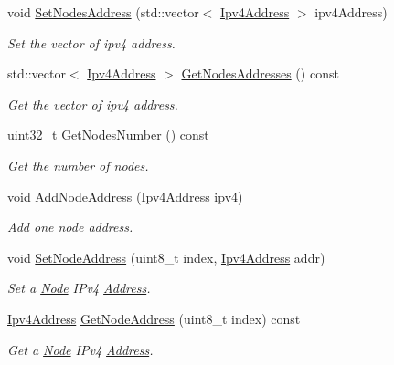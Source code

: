 \begin{DoxyCompactItemize}
void \hyperlink{classns3_1_1dsr_1_1DsrOptionRreqHeader_a0bff4d1e588cb2c91ad8b48cf5e551bb}{Set\+Nodes\+Address} (std\+::vector$<$ \hyperlink{classns3_1_1Ipv4Address}{Ipv4\+Address} $>$ ipv4\+Address)
\begin{DoxyCompactList}\small\item\em Set the vector of ipv4 address. \end{DoxyCompactList}\item 
std\+::vector$<$ \hyperlink{classns3_1_1Ipv4Address}{Ipv4\+Address} $>$ \hyperlink{classns3_1_1dsr_1_1DsrOptionRreqHeader_a5998beb11675cb708d9a943a01487ce6}{Get\+Nodes\+Addresses} () const 
\begin{DoxyCompactList}\small\item\em Get the vector of ipv4 address. \end{DoxyCompactList}\item 
uint32\+\_\+t \hyperlink{classns3_1_1dsr_1_1DsrOptionRreqHeader_aae0419a21f155cd8f28f781abd7c3ad4}{Get\+Nodes\+Number} () const 
\begin{DoxyCompactList}\small\item\em Get the number of nodes. \end{DoxyCompactList}\item 
void \hyperlink{classns3_1_1dsr_1_1DsrOptionRreqHeader_ae129d6d2ffc45297396b07b50fcd36e5}{Add\+Node\+Address} (\hyperlink{classns3_1_1Ipv4Address}{Ipv4\+Address} ipv4)
\begin{DoxyCompactList}\small\item\em Add one node address. \end{DoxyCompactList}\item 
void \hyperlink{classns3_1_1dsr_1_1DsrOptionRreqHeader_a32c1953d0668c8a401835a34f46b2aff}{Set\+Node\+Address} (uint8\+\_\+t index, \hyperlink{classns3_1_1Ipv4Address}{Ipv4\+Address} addr)
\begin{DoxyCompactList}\small\item\em Set a \hyperlink{classns3_1_1Node}{Node} I\+Pv4 \hyperlink{classns3_1_1Address}{Address}. \end{DoxyCompactList}\item 
\hyperlink{classns3_1_1Ipv4Address}{Ipv4\+Address} \hyperlink{classns3_1_1dsr_1_1DsrOptionRreqHeader_a7ec2e031d3996323118702d805aabe9c}{Get\+Node\+Address} (uint8\+\_\+t index) const 
\begin{DoxyCompactList}\small\item\em Get a \hyperlink{classns3_1_1Node}{Node} I\+Pv4 \hyperlink{classns3_1_1Address}{Address}. \end{DoxyCompactList}\item 

\end{DoxyCompactItemize}
